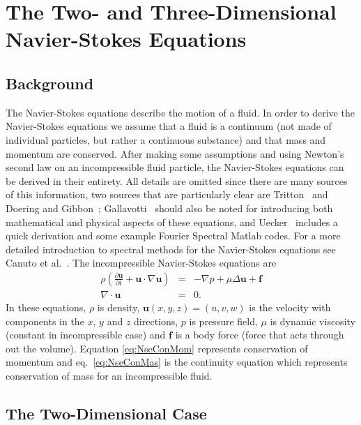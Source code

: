 \chapter{The Two- and Three-Dimensional Navier-Stokes Equations}

\section{Background}
The Navier-Stokes equations describe the motion of a fluid. In order to derive the Navier-Stokes equations we assume that a fluid is a continuum (not made of individual particles, but rather a continuous substance) and that mass and momentum are conserved. After making some assumptions and using Newton's second law on an incompressible fluid particle, the Navier-Stokes equations can be derived in their entirety. All details are omitted since there are many sources of this information, two sources that are particularly clear are Tritton~\cite{Tri88} and Doering and Gibbon~\cite{DoeGib95}; Gallavotti~\cite{Gal02} should also be noted for introducing both mathematical and physical aspects of these equations, and Uecker~\cite{Uec09} includes a quick derivation and some example Fourier Spectral Matlab codes. For a more detailed introduction to spectral methods for the Navier-Stokes equations see Canuto et al.~\cite{CHQZ07}. The incompressible Navier-Stokes equations  are
\begin{eqnarray}
\rho \left (\frac{\partial \mathbf{u}}{\partial t} + \mathbf{u} \cdot \nabla \mathbf{u} \right)&=&-\nabla p + \mu \Delta \mathbf{u} + \mathbf{f} \label{eq:NseConMom}\\
\nabla \cdot \mathbf{u} &=& 0. \label{eq:NseConMas}
\end{eqnarray}
In these equations, $\rho$ is density, $\mathbf{u}(x,y,z)=(u,v,w)$ is the velocity with components in the $x$, $y$ and $z$ directions, $p$ is pressure field, $\mu$ is dynamic viscosity (constant in incompressible case) and $\mathbf{f}$ is a body force (force that acts through out the volume). Equation \eqref{eq:NseConMom} represents conservation of momentum and eq.\ \eqref{eq:NseConMas} is the continuity equation which represents conservation of mass for an incompressible fluid.  

\section{The Two-Dimensional Case}

